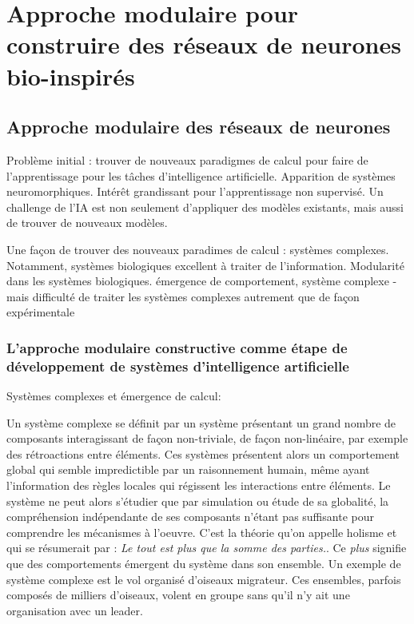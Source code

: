 \part{Approche modulaire pour construire des réseaux de neurones bio-inspirés}
\chapter{Approche modulaire des réseaux de neurones}
\graphicspath{{01-Modularite/}}
\minitoc


Problème initial : trouver de nouveaux paradigmes de calcul pour faire de l'apprentissage pour les tâches d'intelligence artificielle.
Apparition de systèmes neuromorphiques. Intérêt grandissant pour l'apprentissage non supervisé. Un challenge de l'IA est non seulement d'appliquer des modèles existants, mais aussi de trouver de nouveaux modèles. 

Une façon de trouver des nouveaux paradimes de calcul : systèmes complexes.
Notamment, systèmes biologiques excellent à traiter de l'information. Modularité dans les systèmes biologiques.
émergence de comportement, système complexe - mais difficulté de traiter les systèmes complexes autrement que de façon expérimentale

\section{L'approche modulaire constructive comme étape de développement de systèmes d'intelligence artificielle}
Systèmes complexes et émergence de calcul:




Un système complexe se définit par un système présentant un grand nombre de composants interagissant de façon non-triviale, de façon non-linéaire, par exemple des rétroactions entre éléments. Ces systèmes présentent alors un comportement global qui semble impredictible par un raisonnement humain, même ayant l'information des règles locales qui régissent les interactions entre éléments. Le système ne peut alors s'étudier que par simulation ou étude de sa globalité, la compréhension indépendante de ses composants n'étant pas suffisante pour comprendre les mécanismes à l'oeuvre. C'est la théorie qu'on appelle holisme et qui se résumerait par : \emph{Le tout est plus que la somme des parties.}. Ce \emph{plus} signifie que des comportements émergent du système dans son ensemble. Un exemple de système complexe  est le vol organisé d'oiseaux migrateur. Ces ensembles, parfois composés de milliers d'oiseaux, volent en groupe sans qu'il n'y ait une organisation avec un leader.

